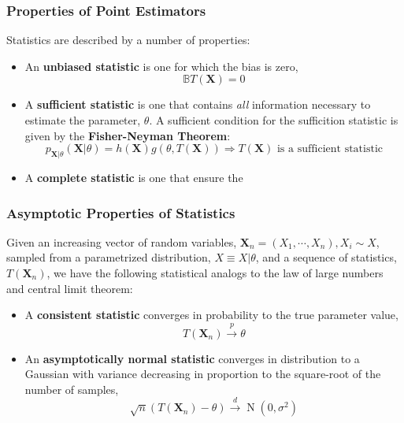\documentclass[12pt, twoside, draft]{article}
\begin{document}
\subsubsection{Properties of Point Estimators}\label{sec:properties_point_estimators}
Statistics are described by a number of properties:
\begin{itemize}
\item An \textbf{unbiased statistic} is one for which the bias is zero,
\begin{equation}
\mathbb{B} T(\mathbf{X}) = 0
\end{equation}
\item A \textbf{sufficient statistic}  is one that contains \textit{all} information necessary to estimate the parameter, $\theta$. A sufficient condition for the sufficition statistic is given by the \textbf{Fisher-Neyman Theorem}:
\begin{equation}
p_{\mathbf{X} | \theta} (\mathbf{X} | \theta) = h(\mathbf{X}) g(\theta, T(\mathbf{X})) \Rightarrow T(\mathbf{X}) \text{ is a sufficient statistic}
\end{equation}
\item A \textbf{complete statistic} is one that ensure the 
\end{itemize}

\subsubsection{Asymptotic Properties of Statistics}\label{sec:asymptotic_properties_statistics}
Given an increasing vector of random variables, $\mathbf{X}_n = (X_1, \cdots, X_n), X_i \sim X$, sampled from a parametrized distribution, $X \equiv X | \theta$, and a sequence of statistics, $T(\mathbf{X}_n)$, we have the following statistical analogs to the law of large numbers and central limit theorem:

\begin{itemize}
\item A \textbf{consistent statistic} converges in probability to the true parameter value,
\begin{equation}
T(\mathbf{X}_n) \stackrel{p}{\longrightarrow} \theta
\end{equation}
\item An \textbf{asymptotically normal statistic} converges in distribution to a Gaussian with variance decreasing in proportion to the square-root of the number of samples,
\begin{equation}
\sqrt{n} (T(\mathbf{X}_n) - \theta) \stackrel{d}{\longrightarrow} \operatorname{N}(0,\sigma^2)
\end{equation}
\end{itemize}
\end{document}
